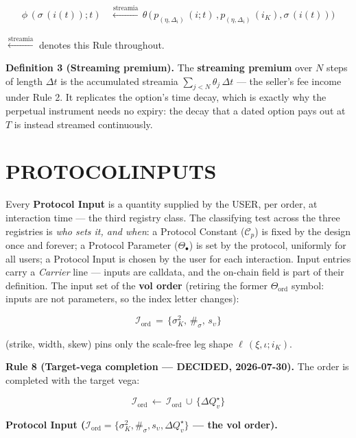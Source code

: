 \documentclass[11pt]{article}
\renewcommand{\_}{\textunderscore\allowbreak}
\begin{document}
\[
    \begin{aligned}
        \phi \, ( \sigma \, (i (t));t) \, & \overset{\text{streamia}}{\longleftarrow} \, \theta \, \Big (\, p_{(\eta, \Delta_i)} \, (i; t) \, , p_{(\eta, \Delta_i)} \, (i_K),  \sigma \, (i (t)) \Big )
    \end{aligned}
\]

\(\overset{\text{streamia}}{\longleftarrow}\) denotes this Rule throughout.

\textbf{Definition 3 (Streaming premium).} The \textbf{streaming premium} over \(N\) steps of length \(\Delta t\) is the accumulated streamia \(\sum_{j<N}\theta_j\,\Delta t\) --- the seller's fee income under Rule 2. It replicates the option's time decay, which is exactly why the perpetual instrument needs no expiry: the decay that a dated option pays out at \(T\) is instead streamed continuously.

\section*{PROTOCOL\_INPUTS}\label{protocol_inputs}

Every \textbf{Protocol Input} is a quantity supplied by the USER, per order, at interaction time --- the third registry class. The classifying test across the three registries is \emph{who sets it, and when}: a Protocol Constant (\(\mathcal{C}_p\)) is fixed by the design once and forever; a Protocol Parameter (\(\Theta_{\bullet}\)) is set by the protocol, uniformly for all users; a Protocol Input is chosen by the user for each interaction. Input entries carry a \emph{Carrier} line --- inputs are calldata, and the on-chain field is part of their definition. The input set of the \textbf{vol order} (retiring the former \(\Theta_{\text{ord}}\) symbol: inputs are not parameters, so the index letter changes):

\[
    \mathcal{I}_{\text{ord}} \,=\, \{\sigma^2_K,\, \#_{\sigma},\, s_{\upsilon}\}
\]

(strike, width, skew) pins only the scale-free leg shape \(\ell\,(\xi, \iota; i_K)\).

\textbf{Rule 8 (Target-vega completion --- DECIDED, 2026-07-30).} The order is completed with the target vega:

\[
    \mathcal{I}_{\text{ord}} \,\leftarrow\, \mathcal{I}_{\text{ord}} \,\cup\, \{\Delta Q_v^{\star}\}
\]

\textbf{Protocol Input (\(\mathcal{I}_{\text{ord}} = \{\sigma^2_K, \#_{\sigma}, s_{\upsilon}, \Delta Q_v^{\star}\}\) --- the vol order).}
\end{document}
